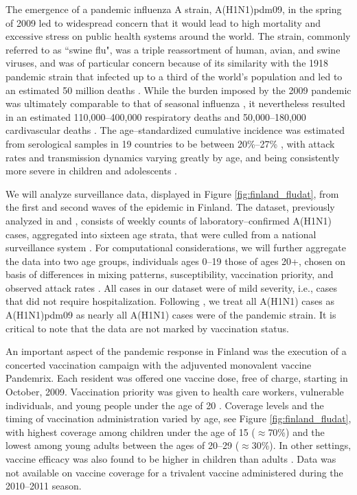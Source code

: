 The emergence of a pandemic influenza A strain, A(H1N1)pdm09, in the spring of 2009 led to widespread concern that it would lead to high mortality and excessive stress on public health systems around the world. The strain, commonly referred to as ``swine flu", was a triple reassortment of human, avian, and swine viruses, and was of particular concern because of its similarity with the 1918 pandemic strain that infected up to a third of the world's population and led to an estimated 50 million deaths \cite{cdc1918pandemic}. While the burden imposed by the 2009 pandemic was ultimately comparable to that of seasonal influenza \cite{iuliano2018estimates}, it nevertheless resulted in an estimated 110,000--400,000 respiratory deaths and 50,000--180,000 cardivascular deaths \cite{dawood2012estimated}. The age--standardized cumulative incidence was estimated from serological samples in 19 countries to be between 20\%--27\% \cite{van2013estimating}, with attack rates and transmission dynamics varying greatly by age, and being consistently more severe in children and adolescents \cite{opatowski2011transmission,steens2011age,van2013estimating,yang2015inference}. 

We will analyze surveillance data, displayed in Figure \ref{fig:finland_fludat}, from the first and second waves of the epidemic in Finland. The dataset, previously analyzed in \cite{shubin2016revealing} and \cite{shubin2014estimating}, consists of weekly counts of laboratory--confirmed A(H1N1) cases, aggregated into sixteen age strata, that were culled from a national surveillance system \cite{lyytikainen2011surveillance}. For computational considerations, we will further aggregate the data into two age groups, individuals ages 0--19 those of ages 20+, chosen on basis of differences in mixing patterns, susceptibility, vaccination priority, and observed attack rates \cite{kelly2011age,opatowski2011transmission,steens2011age}. All cases in our dataset were of mild severity, i.e., cases that did not require hospitalization. Following \cite{shubin2016revealing,shubin2014estimating}, we treat all A(H1N1) cases as A(H1N1)pdm09 as nearly all A(H1N1) cases were of the pandemic strain. It is critical to note that the data are not marked by vaccination status.

An important aspect of the pandemic response in Finland was the execution of a concerted vaccination campaign with the adjuvented monovalent vaccine Pandemrix. Each resident was offered one vaccine dose, free of charge, starting in October, 2009. Vaccination priority was given to health care workers, vulnerable individuals, and young people under the age of 20 \cite{syrjanen2014effectiveness}.  Coverage levels and the timing of vaccination administration varied by age, see Figure \ref{fig:finland_fludat}, with highest coverage among children under the age of 15 ($ \approx $70\%) and the lowest among young adults between the ages of 20--29 ($ \approx $30\%). In other settings, vaccine efficacy was also found to be higher in children than adults \cite{lansbury2017effectiveness}. Data was not available on vaccine coverage for a trivalent vaccine administered during the 2010--2011 season. 

